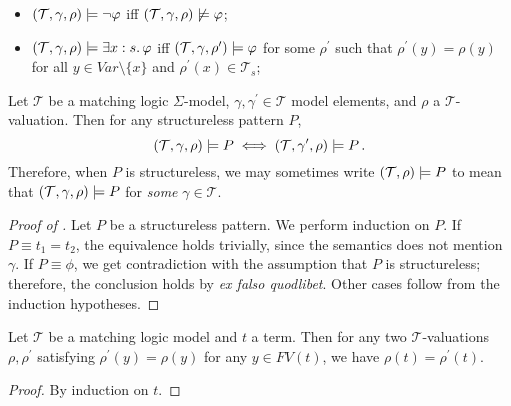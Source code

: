 \begin{definition}
\begin{enumerate}
\begin{itemize}
              \item $(\mathcal{T}, \gamma, \rho) \models \neg \varphi$ iff
                $(\mathcal{T}, \gamma, \rho) \not\models \varphi$;
              \item $(\mathcal{T}, \gamma, \rho) \models \exists x : s.\, \varphi$ iff
                $(\mathcal{T}, \gamma, \rho^\prime) \models \varphi$ for some $\rho^\prime$ such that
                $\rho^\prime(y) = \rho(y)$ for all $y \in \mathit{Var} \setminus \{ x \}$
                and $\rho^\prime(x) \in \mathcal{T}_s$;
          \end{itemize}
          
\end{enumerate}

\end{definition}


\begin{lemma}\label{lem:structurelessSemantics}
Let $\mathcal{T}$ be a matching logic $\Sigma$-model, $\gamma,\gamma^\prime \in \mathcal{T}$ model elements,
and $\rho$ a $\mathcal{T}$-valuation. Then for any structureless pattern $P$,
\begin{equation*}
    (\mathcal{T}, \gamma, \rho) \models P \iff (\mathcal{T}, \gamma^\prime, \rho) \models P \, .
\end{equation*}
Therefore, when $P$ is structureless, we may sometimes write $(\mathcal{T}, \rho) \models P$ to mean that 
$(\mathcal{T}, \gamma, \rho) \models P$ for \emph{some} $\gamma \in \mathcal{T}$.
\end{lemma}
\begin{proof}[Proof of ]
Let $P$ be a structureless pattern.
We perform induction on $P$.
If $P \equiv t_1 = t_2$, the equivalence holds trivially, since the semantics does not mention $\gamma$.
If $P \equiv \phi$, we get contradiction with the assumption that $P$ is structureless;
therefore, the conclusion holds by \emph{ex falso quodlibet}.
Other cases follow from the induction hypotheses.
\end{proof}

\begin{lemma}\label{lem:unusedVariablesTerm}
    Let $\mathcal{T}$ be a matching logic model and $t$ a term.
    Then for any two $\mathcal{T}$-valuations $\rho,\rho^\prime$
    satisfying $\rho^\prime(y) = \rho(y)$ for any $y \in \mathit{FV}(t)$,
    we have $\rho(t) = \rho^\prime(t)$.
\end{lemma}
\begin{proof}
  By induction on $t$.
\end{proof}

